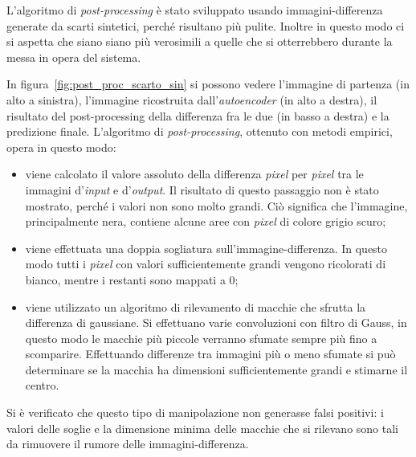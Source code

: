 L'algoritmo di \textit{post-processing} è stato sviluppato usando immagini-differenza generate da scarti sintetici, perché risultano più pulite.
Inoltre in questo modo ci si aspetta che siano siano più verosimili a quelle che si otterrebbero durante la messa in opera del sistema.

In figura~\ref{fig:post_proc_scarto_sin} si possono vedere l'immagine di partenza (in alto a sinistra), l'immagine ricostruita dall'\textit{autoencoder} (in alto a destra), il risultato del post-processing della differenza fra le due (in basso a destra) e la predizione finale.
L'algoritmo di \textit{post-processing}, ottenuto con metodi empirici, opera in questo modo:
\begin{itemize}
  \item viene calcolato il valore assoluto della differenza \textit{pixel} per \textit{pixel} tra le immagini d'\textit{input} e d'\textit{output}.
    Il risultato di questo passaggio non è stato mostrato, perché i valori non sono molto grandi.
    Ciò significa che l'immagine, principalmente nera, contiene alcune aree con \textit{pixel} di colore grigio scuro;

  \item viene effettuata una doppia sogliatura sull'immagine-differenza.
    In questo modo tutti i \textit{pixel} con valori sufficientemente grandi vengono ricolorati di bianco, mentre i restanti sono mappati a $0$;


  \item viene utilizzato un algoritmo di rilevamento di macchie che sfrutta la differenza di gaussiane.
    Si effettuano varie convoluzioni con filtro di Gauss, in questo modo le macchie più piccole verranno sfumate sempre più fino a scomparire.
    Effettuando differenze tra immagini più o meno sfumate si può determinare se la macchia ha dimensioni sufficientemente grandi e stimarne il centro.

\end{itemize}

Si è verificato che questo tipo di manipolazione non generasse falsi positivi: i valori delle soglie e la dimensione minima delle macchie che si rilevano sono tali da rimuovere il rumore delle immagini-differenza.


